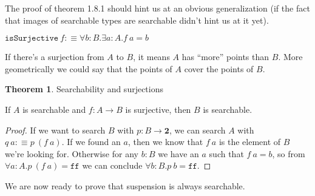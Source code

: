\documentclass[11pt]{article}
\theoremstyle{definition}
\newtheorem{theorem}{Theorem}[section]
\newcommand{\txt}[1]{\texttt{#1}}
\renewcommand{\(}{\left(}
\renewcommand{\)}{\right)}
\newcommand{\defn}{:\equiv}
\newcommand{\apl}[2]{#1\ #2}
\newcommand{\Bool}{\mathbf{2}}
\newcommand{\false}{\txt{ff}}
\newcommand{\all}[2]{\forall #1.#2}
\newcommand{\ex}[2]{\exists #1.#2}
\begin{document}
The proof of theorem 1.8.1 should hint us at an obvious generalization (if the fact that images of searchable types are searchable didn't hint us at it yet).

\newcommand{\isSurjective}{\txt{isSurjective}}
$\apl{\isSurjective}{f} \defn \all{b : B}{\ex{a : A}{\apl{f}{a} = b}}$

If there's a surjection from $A$ to $B$, it means $A$ has ``more'' points than $B$. More geometrically we could say that the points of $A$ cover the points of $B$.

\begin{theorem} Searchability and surjections

If $A$ is searchable and $f : A \to B$ is surjective, then $B$ is searchable.

\end{theorem}
\begin{proof}

If we want to search $B$ with $p : B \to \Bool$, we can search $A$ with $\apl{q}{a} \defn \apl{p}{(\apl{f}{a})}$. If we found an $a$, then we know that $\apl{f}{a}$ is the element of $B$ we're looking for. Otherwise for any $b : B$ we have an $a$ such that $\apl{f}{a} = b$, so from $\all{a : A}{\apl{p}{(\apl{f}{a})} = \false}$ we can conclude $\all{b : B}{\apl{p}{b}} = \false$.

\end{proof}

We are now ready to prove that suspension is always searchable.
\end{document}
